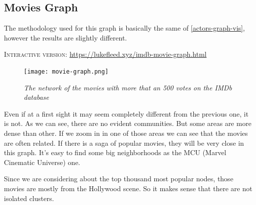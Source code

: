 \subsection{Movies Graph}

The methodology used for this graph is basically the same of \ref{actors-graph-vis}, however the results are slightly different. \s

\textsc{Interactive version}: \url{https://lukefleed.xyz/imdb-movie-graph.html}
\begin{center}
    \s \nd {}
\end{center}

\s

\begin{figure}[H] \label{imdb-m-network}
    \centering
    \texttt{[image: movie-graph.png]}
    \caption{\emph{The network of the movies with more that an 500 votes on the IMDb database}}
\end{figure}

Even if at a first sight it may seem completely different from the previous one, it is not. As we can see, there are no evident communities. But some areas are more dense than other. If we zoom in in one of those areas we can see that the movies are often related. If there is a saga of popular movies, they will be very close in this graph. It's easy to find some big neighborhoods as the MCU (Marvel Cinematic Universe) one. \s

\nd Since we are considering about the top thousand most popular nodes, those movies are mostly from the Hollywood scene. So it makes sense that there are not isolated clusters.
